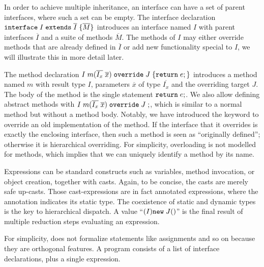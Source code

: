 In order to achieve multiple inheritance, an interface can have a set of 
parent interfaces, where such a set can be empty. The interface declaration $\texttt{interface} \; I \; \texttt{extends} \; \overline{I} \; {\{} \overline{M} {\}}$ introduces an interface named $I$ with parent interfaces $\overline{I}$ and a suite of methods $\overline{M}$. The methods of $I$ may either override methods that are already defined in $\overline{I}$ or add new functionality special to $I$, we will illustrate this in more detail later.

The method declaration $I \; m (\overline{I_x} \; \overline{x}) \; \texttt{override} \; J \; {\{} \texttt{return} \; e ; {\}}$ introduces a
method named $m$ with result type $I$, parameters $\overline{x}$ of
type $\overline{I_x}$ and the overriding target $J$. The body of the
method is the single statement $ \texttt{return} \; e;$. We also allow
defining abstract methods with $I \; m (\overline{I_x} \; \overline{x}) \; \texttt{override} \; J \; ;$, which is
similar to a normal method but without a method body. Notably, we have introduced the
\kwoverride{} keyword to override an old implementation of the
method. If the interface that it overrides is exactly the enclosing
interface, then such a method is seen as ``originally defined''; otherwise
it is hierarchical overriding.
For simplicity, overloading is not modelled for methods, which
implies that we can uniquely identify a method by its name.

Expressions can be standard constructs such as variables, method
invocation, or object creation, together with casts.
Again, to be concise, the casts are merely safe up-casts. Those cast-expressions
are in fact annotated expressions, where the annotation indicates its static type.
The coexistence of static and dynamic types is the key to hierarchical dispatch.
A value
``$(I)\texttt{new} \; J()$''
is the final result of multiple reduction steps evaluating an
expression.

For simplicity, \name{} does not formalize statements like assignments and so on because they are orthogonal features.
A program consists of a list of interface declarations, plus a single expression.

